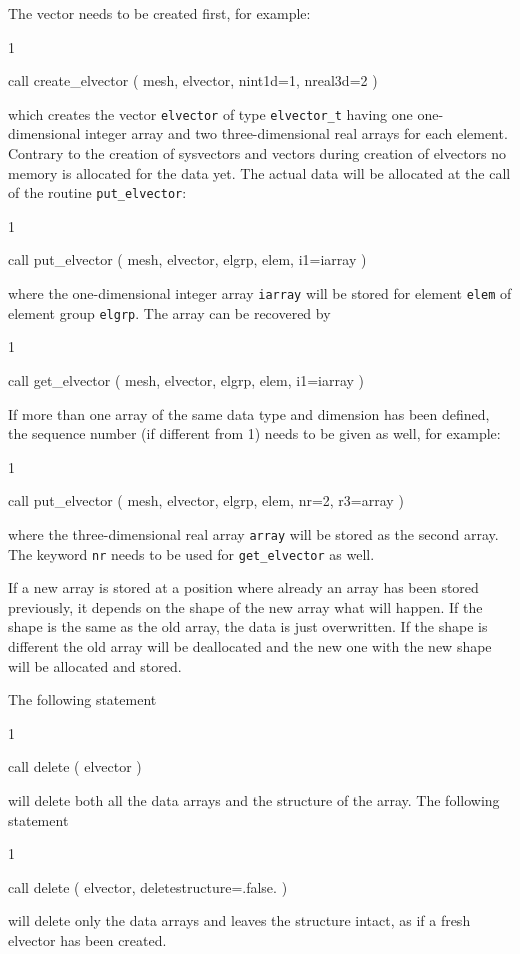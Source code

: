 The vector needs to be created first, for example:
\begin{listing}{1}
   
  call create_elvector ( mesh, elvector, nint1d=1, nreal3d=2 )

\end{listing}
which creates the vector \texttt{elvector} of type \texttt{elvector\_t} having
one one-dimensional integer array and two three-dimensional real arrays for each
element. Contrary to the creation of sysvectors and vectors during creation of
elvectors no memory is allocated for the data yet. The actual data will be
allocated at the call of the routine \texttt{put\_elvector}:
\begin{listing}{1}

  call put_elvector ( mesh, elvector, elgrp, elem, i1=iarray )

\end{listing}
where the one-dimensional integer array \texttt{iarray} will be stored for
element \texttt{elem} of element group \texttt{elgrp}. The array can be
recovered by
\begin{listing}{1}

  call get_elvector ( mesh, elvector, elgrp, elem, i1=iarray )

\end{listing}
If more than one array of the same data type and dimension has been defined,
the sequence number (if different from 1) needs to be given as well,
for example:
\begin{listing}{1}

  call put_elvector ( mesh, elvector, elgrp, elem, nr=2, r3=array )

\end{listing}
where the three-dimensional real array \texttt{array} will be stored as the
second array. The keyword \texttt{nr} needs to be used for
\texttt{get\_elvector} as well.

If a new array is stored at a position where already an array has been
stored previously, it
depends on the shape of the new array what will happen. If the shape is the
same as the old array, the data is just overwritten. If the shape is different
the old array will be deallocated and the
new one with the new shape will be allocated and stored.

The following statement
\begin{listing}{1}

   call delete ( elvector )

\end{listing}
will delete both all the data arrays and the structure of the array.
The following statement
\begin{listing}{1}

   call delete ( elvector, deletestructure=.false. )

\end{listing}
will delete only the data arrays and leaves the structure intact, as if a fresh
elvector has been created.


